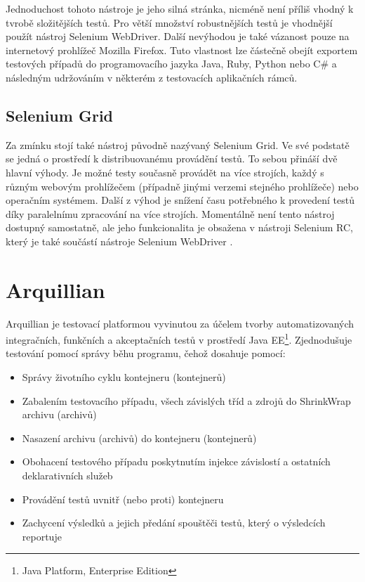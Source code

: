 \documentclass[
    color,   %
	table,   %
    twoside, %
]{fithesis3}
\begin{document}
Jednoduchost tohoto nástroje je jeho silná stránka, nicméně není příliš vhodný k tvrobě složitějších testů. Pro větší množství robustnějších testů je vhodnější použít nástroj Selenium WebDriver. Další nevýhodou je také vázanost pouze na internetový prohlížeč Mozilla Firefox. Tuto vlastnost lze částečně obejít exportem testových případů do programovacího jazyka Java, Ruby, Python nebo C\# a následným udržováním v některém z testovacích aplikačních rámců.

\subsection{Selenium Grid}
Za zmínku stojí také nástroj původně nazývaný Selenium Grid. Ve své podstatě se jedná o prostředí k distribuovanému provádění testů. To sebou přináší dvě hlavní výhody. Je možné testy současně provádět na více strojích, každý s různým webovým prohlížečem (případně jinými verzemi stejného prohlížeče) nebo operačním systémem. Další z výhod je snížení času potřebného k provedení testů díky paralelnímu zpracování na více strojích. Momentálně není tento nástroj dostupný samostatně, ale jeho funkcionalita je obsažena v nástroji Selenium RC, který je také součástí nástroje Selenium WebDriver \cite{Selenium}.

\section{Arquillian}

Arquillian je testovací platformou vyvinutou za účelem tvorby automatizovaných integračních, funkčních a akceptačních testů v prostředí Java EE\footnote{Java Platform, Enterprise Edition}. Zjednodušuje testování pomocí správy běhu programu, čehož dosahuje pomocí:
\begin{itemize}
\item Správy životního cyklu kontejneru (kontejnerů)
\item Zabalením testovacího případu, všech závislých tříd a zdrojů do ShrinkWrap \cite{ShrinkWrap} archivu (archivů)
\item Nasazení archivu (archivů) do kontejneru (kontejnerů)
\item Obohacení testového případu poskytnutím injekce závislostí a ostatních deklarativních služeb
\item Provádění testů uvnitř (nebo proti) kontejneru
\item Zachycení výsledků a jejich předání spouštěči testů, který o výsledcích reportuje
\end{itemize}
\end{document}
